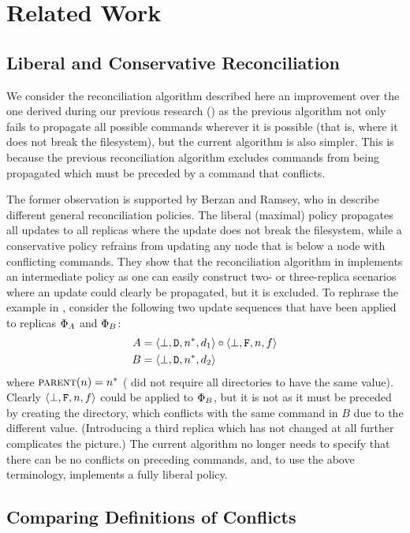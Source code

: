 
\section{Related Work}

\subsection{Liberal and Conservative Reconciliation}

We consider the reconciliation algorithm described here an improvement over
the one derived during our previous research (\cite{NREC})
as the previous algorithm not only fails to propagate all possible commands
wherever it is possible (that is, where it does not break the filesystem),
but the current algorithm is also simpler.
This is because the previous reconciliation algorithm excludes
commands from being propagated which must be preceded by a command that conflicts.

The former observation is supported by Berzan and Ramsey, who in \cite{CBNR} 
describe different general reconciliation policies.
The liberal (maximal) policy propagates all updates to all replicas where
the update does not break the filesystem, while a conservative policy
refrains from updating any node that is below a node with conflicting commands.
They show that the reconciliation algorithm in \cite{NREC} implements
an intermediate policy as one can easily construct two- or three-replica scenarios
where an update could clearly be propagated, but it is excluded.
To rephrase the example in \cite{CBNR}, consider the following two
update sequences that have been applied to replicas $\Phi_A$ and $\Phi_B$:
\begin{align*}
A&=\langle{\bot,\mathtt{D},n^*,d_1}\rangle\circ\langle{\bot,\mathtt{F},n,f}\rangle \\
B&=\langle{\bot,\mathtt{D},n^*,d_2}\rangle
\end{align*}
where $\text{\normalfont\scshape{parent}}(n)=n^*$ (\cite{NREC} did not require all directories to have the same value).
Clearly $\langle{\bot,\mathtt{F},n,f}\rangle$ could be applied to $\Phi_B$, but it is not as
it must be preceded by creating the directory, which conflicts with the same command in $B$
due to the different value.
(Introducing a third replica which has not changed at all further complicates the picture.)
The current algorithm no longer needs to specify that there can be no conflicts
on preceding commands, and, to use the above terminology, implements a fully liberal policy.


\subsection{Comparing Definitions of Conflicts}

